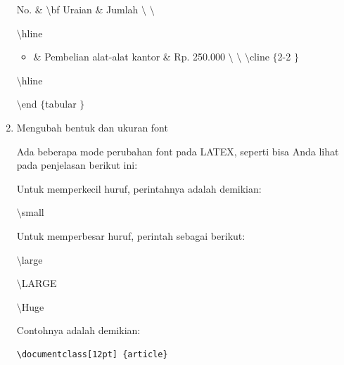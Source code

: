\begin{enumerate}
{\fontsize{10pt}{10pt}\selectfont No.  $  \&  $  $  \setminus  $bf Uraian  $  \&  $ Jumlah  $  \setminus  $ $  \setminus  $} \par
{\fontsize{10pt}{10pt}\selectfont  $  \setminus  $hline} \par
\begin{itemize}
\item {\fontsize{10pt}{10pt}\selectfont  $  \&  $ Pembelian alat-alat kantor  $  \&  $ Rp. 250.000  $  \setminus  $ $  \setminus  $  $  \setminus  $cline $  \{  $2-2 $  \}  $}\end{itemize}
 \par
{\fontsize{10pt}{10pt}\selectfont  $  \setminus  $hline} \par
{\fontsize{10pt}{10pt}\selectfont  $  \setminus  $end $  \{  $tabular $  \}  $} \par
\vspace{12pt}
\noindent 
\item Mengubah bentuk dan ukuran font \par
Ada beberapa mode perubahan font pada LATEX, seperti bisa Anda lihat pada penjelasan berikut ini:
 \par
\vspace{12pt}
Untuk memperkecil huruf, perintahnya adalah demikian: \par
 $  \setminus  $small \par
\vspace{12pt}
Untuk memperbesar huruf, perintah sebagai berikut: \par
{\fontsize{10pt}{10pt}\selectfont  $  \setminus  $large} \par
{\fontsize{10pt}{10pt}\selectfont  $  \setminus  $LARGE} \par
{\fontsize{10pt}{10pt}\selectfont  $  \setminus  $Huge} \par
\vspace{12pt}
Contohnya adalah demikian: \par
\begin{verbatim}
\documentclass[12pt] {article} 
 


\end{verbatim}
\end{enumerate}
